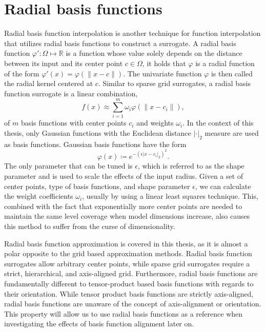 \documentclass[
  a4paper,  %
  twoside,  %
  bibliography=totoc,
  headsepline,
  cleardoublepage=empty,
  parskip=half,
  draft=false
]{scrbook}
\begin{document}
\section{Radial basis functions}

Radial basis function interpolation \cite{Broomhead1988} is another technique for function interpolation that utilizes radial basis functions to construct a surrogate.
A radial basis function $\varphi' \colon \Omega \mapsto \mathds{R}$ is a function whose value solely depends on the distance between its input and its center point $c \in \Omega$, \ie it holds that $\varphi$ is a radial function of the form $\varphi'(x)=\varphi(\|x - c\|)$.
The univariate function $\varphi$ is then called the radial kernel centered at $c$.
Similar to sparse grid surrogates, a radial basis function surrogate is a linear combination,
\begin{equation}
f(x) \approx \sum_{i=1}^m \omega_i \varphi(\|x - c_i\|),
\end{equation}
of $m$ basis functions with center points $c_i$ and weights $\omega_i$.
In the context of this thesis, only Gaussian functions with the Euclidean distance $|\cdot |_2$ measure are used as basis functions.
Gaussian basis functions have the form
\begin{equation}
\varphi(x) \coloneqq e^{-(\epsilon |x - c_i|_2)^2}.
\end{equation}
%
The only parameter that can be tuned is $\epsilon$, which is referred to as the shape parameter and is used to scale the effects of the input radius.
Given a set of center points, type of basis functions, and shape parameter $\epsilon$, we can calculate the weight coefficients $\omega_i$, usually by using a linear least squares technique.
This, combined with the fact that exponentially more center points are needed to maintain the same level coverage when model dimensions increase, also causes this method to suffer from the curse of dimensionality.

Radial basis function approximation is covered in this thesis, as it is almost a polar opposite to the grid based approximation methods.
Radial basis function surrogates allow arbitrary center points, while sparse grid surrogates require a strict, hierarchical, and axis-aligned grid.
Furthermore, radial basis functions are fundamentally different to tensor-product based basis functions with regards to their orientation.
While tensor product basis functions are strictly axis-aligned, radial basis functions are unaware of the concept of axis-alignment or orientation.
This property will allow us to use radial basis functions as a reference when investigating the effects of basis function alignment later on.
\end{document}
